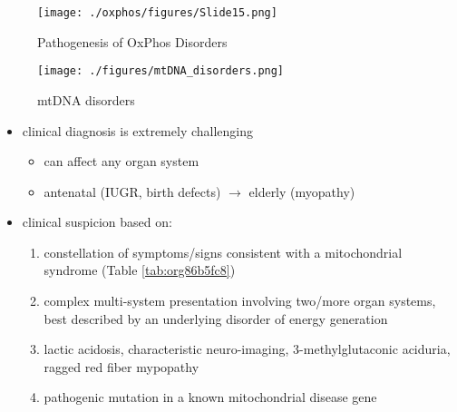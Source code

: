 \documentclass{scrartcl}
\begin{document}
\begin{figure}[htbp]
\centering
\texttt{[image: ./oxphos/figures/Slide15.png]}
\caption[ETC]{\label{fig:org2c2c933}
Pathogenesis of OxPhos Disorders}
\end{figure}


\begin{figure}[htbp]
\centering
\texttt{[image: ./figures/mtDNA\_disorders.png]}
\caption{\label{fig:org0f7a458}
mtDNA disorders}
\end{figure}


\begin{itemize}
\item clinical diagnosis is extremely challenging
\begin{itemize}
\item can affect any organ system
\item antenatal (IUGR, birth defects) \(\to\) elderly (myopathy)
\end{itemize}

\item clinical suspicion based on:
\begin{enumerate}
\item constellation of symptoms/signs consistent with a mitochondrial syndrome (Table \ref{tab:org86b5fc8})
\item complex multi-system presentation involving two/more organ systems,
best described by an underlying disorder of energy generation
\item lactic acidosis, characteristic neuro-imaging, 3-methylglutaconic
aciduria, ragged red fiber mypopathy
\item pathogenic mutation in a known mitochondrial disease gene
\end{enumerate}
\end{itemize}
\end{document}
